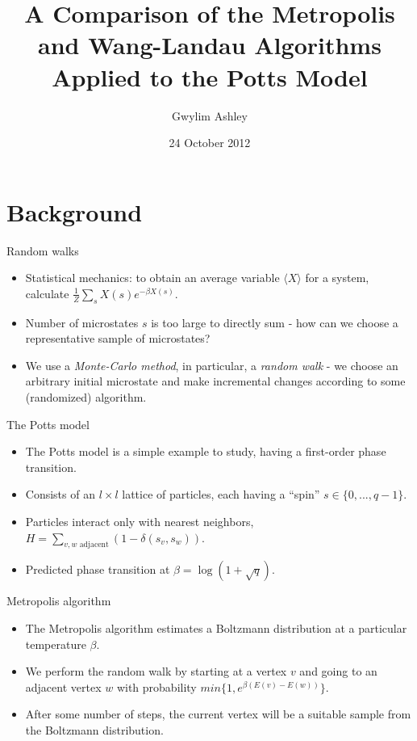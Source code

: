 \documentclass{beamer}
\title[Metropolis and Wang-Landau algoritms]{A Comparison of the Metropolis and Wang-Landau Algorithms Applied to the Potts Model}
\author{Gwylim Ashley}
\date{24 October 2012}
\begin{document}
\begin{frame}
  \titlepage
\end{frame}

\section{Background}
\begin{frame}{Random walks}
    \begin{itemize}
        \item Statistical mechanics: to obtain an average variable $\langle X\rangle$ for a system, calculate $\frac{1}{Z}\sum_s X(s)e^{-\beta X(s)}$.
        \item Number of microstates $s$ is too large to directly sum - how can we choose a representative sample of microstates?
        \item We use a \emph{Monte-Carlo method}, in particular, a \emph{random walk} - we choose an arbitrary initial microstate and make incremental changes according to some (randomized) algorithm.
    \end{itemize}
\end{frame}
\begin{frame}{The Potts model}
    \begin{itemize}
        \item The Potts model is a simple example to study, having a first-order phase transition.
        \item Consists of an $l\times l$ lattice of particles, each having a ``spin'' $s \in \{0,...,q-1\}$.
        \item Particles interact only with nearest neighbors, $H = \sum_{v, w\text{ adjacent}}(1 - \delta(s_v, s_w))$.
        \item Predicted phase transition at $\beta = \log(1 + \sqrt q)$.
    \end{itemize}
\end{frame}
\begin{frame}{Metropolis algorithm}
    \begin{itemize}
        \item The Metropolis algorithm estimates a Boltzmann distribution at a particular temperature $\beta$.
        \item We perform the random walk by starting at a vertex $v$ and going to an adjacent vertex $w$ with probability $min\{1, e^{\beta(E(v) - E(w))}\}$.
        \item After some number of steps, the current vertex will be a suitable sample from the Boltzmann distribution.
    \end{itemize}
\end{frame}
\end{document}
